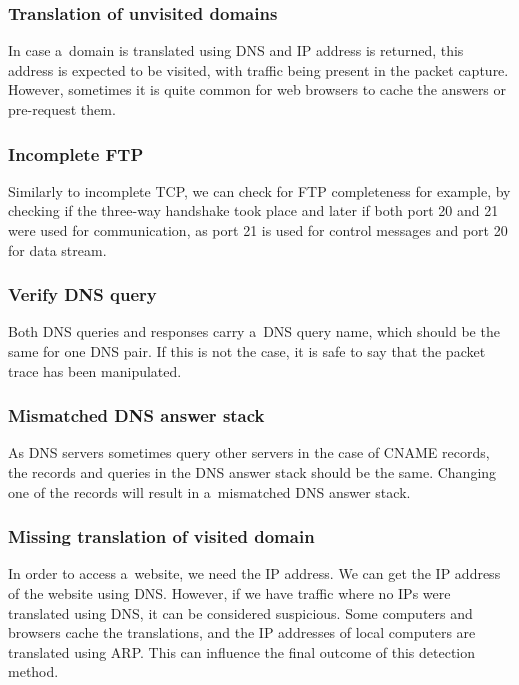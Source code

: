 \documentclass[
  printed,     %
  color,       %
  oneside,     %
  nosansbold,  %
  nocolorbold, %
  nolof,         %
  nolot,         %
]{fithesis4}
\begin{document}
\subsubsection{Translation of unvisited domains}

In case a~domain is translated using DNS and IP address is returned, this address is expected to be visited, with traffic being present in the packet capture. However, sometimes it is quite common for web browsers to cache the answers or pre-request them.

\subsubsection{Incomplete FTP}

Similarly to incomplete TCP, we can check for FTP completeness for example, by checking if the three-way handshake took place and later if both port 20 and 21 were used for communication, as port 21 is used for control messages and port 20 for data stream.

\subsubsection{Verify DNS query}

Both DNS queries and responses carry a~DNS query name, which should be the same for one DNS pair. If this is not the case, it is safe to say that the packet trace has been manipulated.

\subsubsection{Mismatched DNS answer stack}

As DNS servers sometimes query other servers in the case of CNAME records, the records and queries in the DNS answer stack should be the same. Changing one of the records will result in a~mismatched DNS answer stack.

\subsubsection{Missing translation of visited domain}

In order to access a~website, we need the IP address. We can get the IP address of the website using DNS. However, if we have traffic where no IPs were translated using DNS, it can be considered suspicious. Some computers and browsers cache the translations, and the IP addresses of local computers are translated using ARP. This can influence the final outcome of this detection method.
\end{document}
